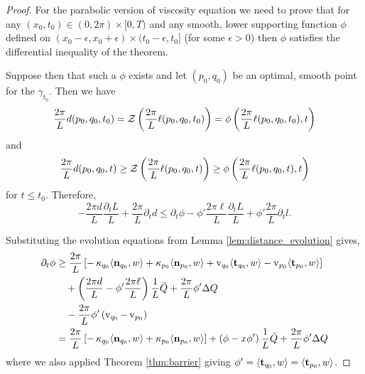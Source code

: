 \documentclass[12pt]{amsart}
\begin{document}
\begin{proof}
For the parabolic version of viscosity equation we need to prove that for any $(x_0, t_0) \in (0, 2\pi) \times [0, T)$ and any smooth, lower supporting function $\phi$ defined on $(x_0 -\epsilon, x_0 + \epsilon) \times (t_0 - \epsilon, t_0]$ (for some $\epsilon > 0$) then $\phi$ satisfies the differential inequality of the theorem.

Suppose then that such a $\phi$ exists and let $(p_0, q_0)$ be an optimal, smooth point for the $\gamma_{t_0}$. Then we have
\[
\frac{2\pi}{L} d(p_0, q_0, t_0) = \operatorname{\mathcal{Z}}\left(\frac{2\pi}{L} \ell(p_0, q_0, t_0)\right) = \phi\left(\frac{2\pi}{L} \ell(p_0, q_0, t_0), t\right)
\]
and
\[
\frac{2\pi}{L} d(p_0, q_0, t) \geq \operatorname{\mathcal{Z}}\left(\frac{2\pi}{L} \ell(p_0, q_0, t)\right) \geq \phi\left(\frac{2\pi}{L} \ell(p_0, q_0, t), t\right)
\]
for $t \leq t_0$. Therefore,
\[
- \frac{2\pi d}{L} \frac{\partial_t L}{L} + \frac{2\pi}{L} \partial_t d \leq \partial_t \phi - \phi' \frac{2\pi \ell}{L} \frac{\partial_t L}{L} +\phi' \frac{2\pi}{L} \partial_t l.
\]

Substituting the evolution equations from Lemma \ref{lem:distance_evolution} gives,
\begin{equation}
\label{eq:time_ineq}
\begin{split}
\partial_t \phi &\geq \frac{2\pi}{L} \left[-\operatorname{\kappa}_{q_0} \langle{\operatorname{\mathbf{n}}_{q_0}},{w}\rangle + \operatorname{\kappa}_{p_0} \langle{\operatorname{\mathbf{n}}_{p_0}},{w}\rangle + \operatorname{v}_{q_0} \langle{\operatorname{\mathbf{t}}_{q_0}},{w}\rangle - \operatorname{v}_{p_0} \langle{\operatorname{\mathbf{t}}_{p_0}},{w}\rangle\right] \\
&\quad + \left(\frac{2\pi d}{L} - \phi' \frac{2\pi \ell}{L}\right) \frac{1}{L} \bar{Q} + \frac{2\pi}{L} \phi' \Delta Q \\
&\quad - \frac{2\pi}{L} \phi' \left(\operatorname{v}_{q_0} - \operatorname{v}_{p_0}\right) \\
&= \frac{2\pi}{L} \left[-\operatorname{\kappa}_{q_0} \langle{\operatorname{\mathbf{n}}_{q_0}},{w}\rangle + \operatorname{\kappa}_{p_0} \langle{\operatorname{\mathbf{n}}_{p_0}},{w}\rangle\right] + \left(\phi - x \phi'\right) \frac{1}{L} \bar{Q} + \frac{2\pi}{L} \phi' \Delta Q
\end{split}
\end{equation}
where we also applied Theorem \ref{thm:barrier} giving $\phi' = \langle{\operatorname{\mathbf{t}}_{q_0}},{w}\rangle = \langle{\operatorname{\mathbf{t}}_{p_0}},{w}\rangle$.


\end{proof}
\end{document}
